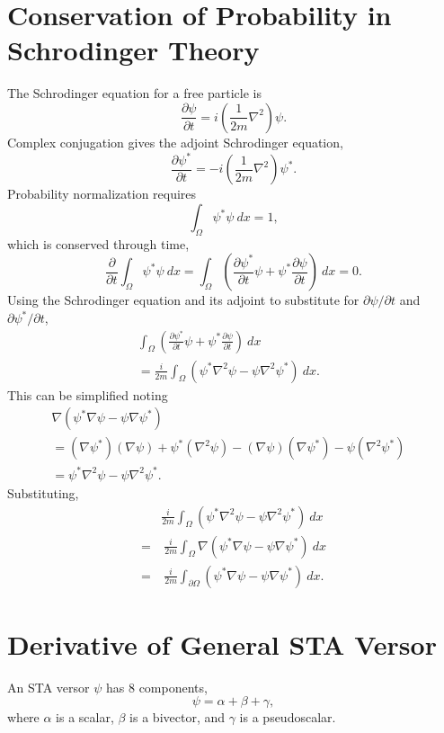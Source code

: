\section{Conservation of Probability in Schrodinger Theory}
The Schrodinger equation for a free particle is
\[
\frac{\partial\psi}{\partial t} = i\left(\frac{1}{2m}\nabla^2\right)\psi.
\]
Complex conjugation gives the adjoint Schrodinger equation,
\[
\frac{\partial\psi^*}{\partial t} = -i\left(\frac{1}{2m}\nabla^2\right)\psi^*.
\]
Probability normalization requires
\[
\int_\Omega \psi^*\psi \: dx = 1,
\]
which is conserved through time,
\[
\frac{\partial}{\partial t} \int_\Omega \psi^*\psi \: dx = \int_\Omega \left(\frac{\partial \psi^*}{\partial t}\psi + \psi^*\frac{\partial \psi}{\partial t}\right) \: dx = 0.
\]
Using the Schrodinger equation and its adjoint to substitute for $\partial \psi /\partial t$ and $\partial \psi^* /\partial t$,
\begin{align*}
\int_\Omega \left(\frac{\partial \psi^*}{\partial t}\psi + \psi^*\frac{\partial \psi}{\partial t}\right) \: dx & \\
= \frac{i}{2m}\int_\Omega\left(\psi^*\nabla^2\psi - \psi\nabla^2\psi^*\right) \: dx.
\end{align*}
This can be simplified noting
\begin{align*}
\nabla\left(\psi^*\nabla\psi - \psi\nabla\psi^*\right) & \\
= \left(\nabla\psi^*\right)\left(\nabla\psi\right) + \psi^*\left(\nabla^2\psi\right) - \left(\nabla\psi\right)\left(\nabla\psi^*\right) - \psi\left(\nabla^2\psi^*\right) &\\
=\psi^*\nabla^2\psi - \psi\nabla^2\psi^*.
\end{align*}
Substituting,
\begin{align*}
&\frac{i}{2m}\int_\Omega\left(\psi^*\nabla^2\psi - \psi\nabla^2\psi^*\right) \: dx \\
=&\: \frac{i}{2m}\int_\Omega\nabla\left(\psi^*\nabla\psi - \psi\nabla\psi^*\right) \: dx \\
=&\: \frac{i}{2m}\int_{\partial\Omega}\left(\psi^*\nabla\psi - \psi\nabla\psi^*\right) \: dx.
\end{align*}
\section{Derivative of General STA Versor}
An STA versor $\psi$ has 8 components,
\[
\psi = \alpha + \beta + \gamma,
\]
where $\alpha$ is a scalar, $\beta$ is a bivector, and $\gamma$ is a pseudoscalar.
